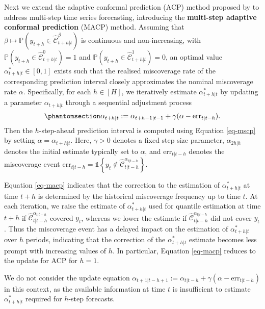 \documentclass[
  11pt,
  12pt]{article}
\theoremstyle{plain}
\theoremstyle{remark}
\begin{document}
Next we extend the adaptive conformal prediction (ACP) method proposed
by \citet{gibbs2021} to address multi-step time series forecasting,
introducing the \textbf{multi-step adaptive conformal prediction} (MACP)
method. Assuming that
\(\beta \mapsto \mathbb{P}(y_{t+h} \in \hat{\mathcal{C}}_{t+h|t}^{\beta})\)
is continuous and non-increasing, with
\(\mathbb{P}(y_{t+h} \in \hat{\mathcal{C}}_{t+h|t}^{0}) = 1\) and
\(\mathbb{P}(y_{t+h} \in \hat{\mathcal{C}}_{t+h|t}^{1}) = 0\), an
optimal value \(\alpha_{t+h|t}^{*} \in [0,1]\) exists such that the
realised miscoverage rate of the corresponding prediction interval
closely approximates the nominal miscoverage rate \(\alpha\).
Specifically, for each \(h \in [H]\), we iteratively estimate
\(\alpha_{t+h|t}^{*}\) by updating a parameter \(\alpha_{t+h|t}\)
through a sequential adjustment process
\begin{equation}\phantomsection\label{eq-macp}{
\alpha_{t+h|t} := \alpha_{t+h-1|t-1} + \gamma(\alpha - \mathrm{err}_{t|t-h}).
}\end{equation} Then the \(h\)-step-ahead prediction interval is
computed using Equation \eqref{eq-mscp} by setting
\(\alpha = \alpha_{t+h|t}\). Here, \(\gamma > 0\) denotes a fixed step
size parameter, \(\alpha_{2h|h}\) denotes the initial estimate typically
set to \(\alpha\), and \(\mathrm{err}_{t|t-h}\) denotes the miscoverage
event
\(\mathrm{err}_{t|t-h} = \mathbb{1}\left\{y_t \notin \hat{\mathcal{C}}_{t|t-h}^{\alpha_{t|t-h}}\right\}\).

Equation \eqref{eq-macp} indicates that the correction to the estimation
of \(\alpha_{t+h|t}^{*}\) at time \(t+h\) is determined by the
historical miscoverage frequency up to time \(t\). At each iteration, we
raise the estimate of \(\alpha_{t+h|t}^{*}\) used for quantile
estimation at time \(t+h\) if
\(\hat{\mathcal{C}}_{t|t-h}^{\alpha_{t|t-h}}\) covered \(y_t\), whereas
we lower the estimate if \(\hat{\mathcal{C}}_{t|t-h}^{\alpha_{t|t-h}}\)
did not cover \(y_t\). Thus the miscoverage event has a delayed impact
on the estimation of \(\alpha_{t+h|t}^{*}\) over \(h\) periods,
indicating that the correction of the \(\alpha_{t+h|t}^{*}\) estimate
becomes less prompt with increasing values of \(h\). In particular,
Equation \eqref{eq-macp} reduces to the update for ACP for \(h=1\).

We do not consider the update equation
\(\alpha_{t+1|t-h+1} := \alpha_{t|t-h} + \gamma(\alpha - \mathrm{err}_{t|t-h})\)
in this context, as the available information at time \(t\) is
insufficient to estimate \(\alpha_{t+h|t}^{*}\) required for \(h\)-step
forecasts.
\end{document}
